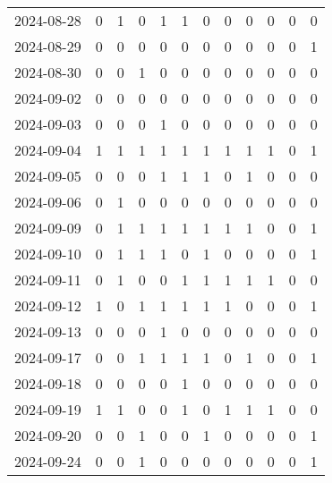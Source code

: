 \documentclass[dvipdfmx,oneside]{article}
\begin{document}
\begin{tabular}{lccccccccccc}
        2024-08-28 &     0 &     1 &     0 &     1 &     1 &     0 &     0 &     0 &     0 &     0 &     0 \\
        2024-08-29 &     0 &     0 &     0 &     0 &     0 &     0 &     0 &     0 &     0 &     0 &     1 \\
        2024-08-30 &     0 &     0 &     1 &     0 &     0 &     0 &     0 &     0 &     0 &     0 &     0 \\
        2024-09-02 &     0 &     0 &     0 &     0 &     0 &     0 &     0 &     0 &     0 &     0 &     0 \\
        2024-09-03 &     0 &     0 &     0 &     1 &     0 &     0 &     0 &     0 &     0 &     0 &     0 \\
        2024-09-04 &     1 &     1 &     1 &     1 &     1 &     1 &     1 &     1 &     1 &     0 &     1 \\
        2024-09-05 &     0 &     0 &     0 &     1 &     1 &     1 &     0 &     1 &     0 &     0 &     0 \\
        2024-09-06 &     0 &     1 &     0 &     0 &     0 &     0 &     0 &     0 &     0 &     0 &     0 \\
        2024-09-09 &     0 &     1 &     1 &     1 &     1 &     1 &     1 &     1 &     0 &     0 &     1 \\
        2024-09-10 &     0 &     1 &     1 &     1 &     0 &     1 &     0 &     0 &     0 &     0 &     1 \\
        2024-09-11 &     0 &     1 &     0 &     0 &     1 &     1 &     1 &     1 &     1 &     0 &     0 \\
        2024-09-12 &     1 &     0 &     1 &     1 &     1 &     1 &     1 &     0 &     0 &     0 &     1 \\
        2024-09-13 &     0 &     0 &     0 &     1 &     0 &     0 &     0 &     0 &     0 &     0 &     0 \\
        2024-09-17 &     0 &     0 &     1 &     1 &     1 &     1 &     0 &     1 &     0 &     0 &     1 \\
        2024-09-18 &     0 &     0 &     0 &     0 &     1 &     0 &     0 &     0 &     0 &     0 &     0 \\
        2024-09-19 &     1 &     1 &     0 &     0 &     1 &     0 &     1 &     1 &     1 &     0 &     0 \\
        2024-09-20 &     0 &     0 &     1 &     0 &     0 &     1 &     0 &     0 &     0 &     0 &     1 \\
        2024-09-24 &     0 &     0 &     1 &     0 &     0 &     0 &     0 &     0 &     0 &     0 &     1 \\

\end{tabular}
\end{document}
